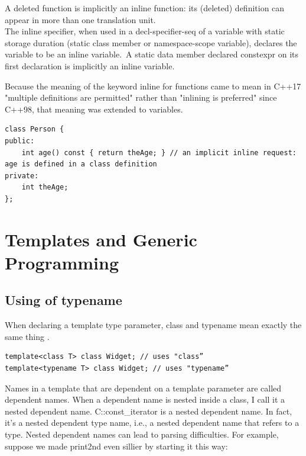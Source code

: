 \documentclass[a4paper,12pt,notitlepage]{article}
\begin{document}
\noindent
A deleted function is implicitly an inline function: its (deleted) definition can appear in more
than one translation unit. \\

\noindent
The inline specifier, when used in a decl-specifier-seq of a variable with static storage duration (static
class member or namespace-scope variable), declares the variable to be an inline variable.\
A static data member declared constexpr on its first declaration is implicitly an inline variable.

Because the meaning of the keyword inline for functions came to mean in C++17 "multiple definitions
are permitted" rather than "inlining is preferred" since C++98, that meaning was extended to
variables.

\begin{verbatim}
class Person {
public:
    int age() const { return theAge; } // an implicit inline request: age is defined in a class definition
private:
    int theAge;
};
\end{verbatim}


\section{Templates and Generic Programming}

\subsection{Using of typename}

\noindent
When declaring a template type parameter, class and typename mean exactly the same thing \cite{Meyers_eff}.

\begin{verbatim}
template<class T> class Widget; // uses "class”
template<typename T> class Widget; // uses "typename”
\end{verbatim}

Names in a template that are dependent on a template parameter are called dependent names. When a dependent name is nested inside a class, I call it a nested dependent name. C::const\_iterator is a nested dependent name. In fact, it's a nested dependent type name, i.e., a nested dependent name that refers to a type.
Nested dependent names can lead to parsing difficulties. For example,
suppose we made print2nd even sillier by starting it this way:
\end{document}
